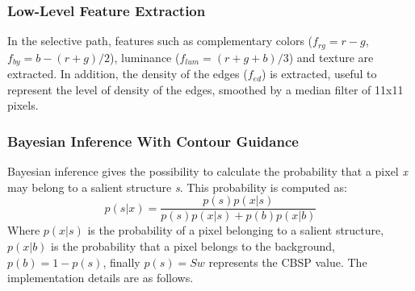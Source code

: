 \subsubsection{Low-Level Feature Extraction}
In the selective path, features such as complementary colors ($ f_{rg} = r-g$, 
$ f_{by} = b-(r+g)/2 $), luminance ($ f_{lum} = (r+g+b)/3 $) and texture are 
extracted. In addition, the density of the edges ($ f_{ed} $) is extracted, useful to 
represent the level of density of the edges, smoothed by a median filter of 
11x11 pixels.

\subsubsection{Bayesian Inference With Contour Guidance}
Bayesian inference gives the possibility to calculate the probability that a 
pixel \emph{x} may belong to a salient structure \emph{s}. This probability is computed as:
$$ p(s|x) = \frac{p(s)p(x|s)}{p(s)p(x|s)+p(b)p(x|b) } $$
Where $ p(x|s) $ is the probability of a pixel belonging to a salient structure, 
$ p(x|b) $ is the probability that a pixel belongs to the background, $ p(b)=1-p(s) $,
finally $ p(s)=Sw $ represents the CBSP value. The implementation 
details are as follows.
